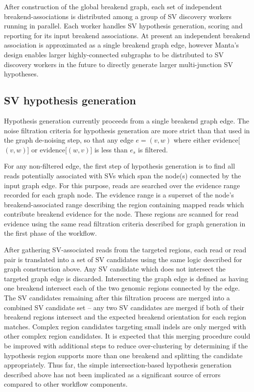 \documentclass{article}
\begin{document}
After construction of the global breakend graph, each set of independent breakend-associations is distributed among a group of SV discovery workers running in parallel. Each worker handles SV hypothesis generation, scoring and reporting for its input breakend associations. At present an independent breakend association is approximated as a single breakend graph edge, however Manta's design enables larger highly-connected subgraphs to be distributed to SV discovery workers in the future to directly generate larger multi-junction SV hypotheses.

\subsection{SV hypothesis generation}

Hypothesis generation currently proceeds from a single breakend graph edge. The noise filtration criteria for hypothesis generation are more strict than that used in the graph de-noising step, so that any edge $e = (v,w)$ where either evidence[$(v,w)$] or evidence[$(w,v)$] is less than $e_s$ is filtered.

For any non-filtered edge, the first step of hypothesis generation is to find all reads potentially associated with SVs which span the node(s) connected by the input graph edge. For this purpose, reads are searched over the evidence range recorded for each graph node. The evidence range is a superset of the node's breakend-associated range describing the region containing mapped reads which contribute breakend evidence for the node. These regions are scanned for read evidence using the same read filtration criteria described for graph generation in the first phase of the workflow.

After gathering SV-associated reads from the targeted regions, each read or read pair is translated into a set of SV candidates using the same logic described for graph construction above. Any SV candidate which does not intersect the targeted graph edge is discarded. Intersecting the graph edge is defined as having one breakend intersect each of the two genomic regions connected by the edge. The SV candidates remaining after this filtration process are merged into a combined SV candidate set -- any two SV candidates are merged if both of their breakend regions intersect and the expected breakend orientation for each region matches. Complex region candidates targeting small indels are only merged with other complex region candidates. It is expected that this merging procedure could be improved with additional steps to reduce over-clustering by determining if the hypothesis region supports more than one breakend and splitting the candidate appropriately. Thus far, the simple intersection-based hypothesis generation described above has not been implicated as a significant source of errors compared to other workflow components.
\end{document}
